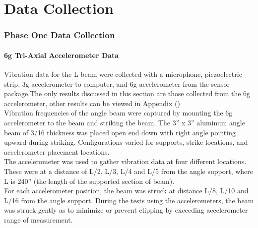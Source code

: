 \chapter{Data Collection}

\subsection{Phase One Data Collection}

\subsubsection{6g Tri-Axial Accelerometer Data }

\indent Vibration data for the L beam were collected with a
microphone, piezoelectric strip, 3g accelerometer to computer,
and 6g accelerometer from the sensor package.The only results
discussed in this section are those collected from the 6g
accelerometer, other results can be viewed in Appendix ()\\

\indent Vibration frequencies of the angle beam were captured
by mounting the 6g accelerometer to the beam and striking the
beam. The 3” x 3” aluminum angle beam of 3/16 thickness was
placed open end down with right angle pointing upward during
striking. Configurations varied for supports, strike
locations, and accelerometer placement locations. \\
\indent The accelerometer was used to gather vibration data at
four different locations. These were at a distance of L/2,
L/3, L/4 and L/5 from the angle support, where L is 240” (the
length of the supported section of beam).\\

\indent For each accelerometer position, the beam was struck at
distance L/8, L/10 and L/16 from the angle support. During the
tests using the accelerometers, the beam was struck gently as
to minimize or prevent clipping by exceeding accelerometer
range of measurement.\\